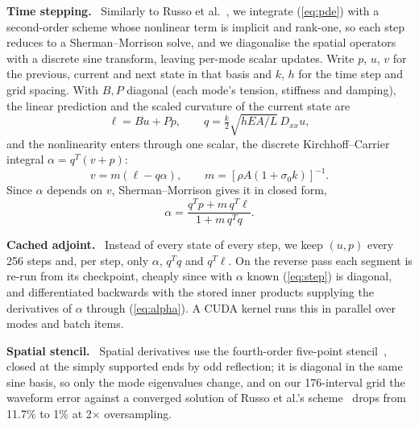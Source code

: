 \documentclass[a4paper]{article}
\newcommand{\head}[1]{\par\vspace{2pt}\noindent\textbf{#1.}\ \ignorespaces}
\begin{document}
\begin{sloppy}
\head{Time stepping}
Similarly to Russo et al.~\cite{russo2026}, we integrate (\ref{eq:pde}) with
a second-order scheme whose nonlinear term is implicit and rank-one, so each
step reduces to a Sherman--Morrison solve, and we diagonalise the spatial
operators with a discrete sine transform, leaving per-mode scalar updates.
Write $p$, $u$, $v$ for the previous, current and next state in that basis
and $k$, $h$ for the time step and grid spacing. With $B,P$ diagonal (each
mode's tension, stiffness and damping), the linear prediction and the scaled
curvature of the current state are
\begin{equation}
\ell=Bu+Pp,\qquad q=\tfrac{k}{2}\sqrt{hEA/L}\,D_{xx}u,
\label{eq:linear}
\end{equation}
and the nonlinearity enters through one scalar, the discrete
Kirchhoff--Carrier integral $\alpha=q^T(v+p)$:
\begin{equation}
v=m(\ell-q\alpha),\qquad m=[\rho A(1+\sigma_0k)]^{-1}.
\label{eq:step}
\end{equation}
Since $\alpha$ depends on $v$, Sherman--Morrison gives it in closed form,
\begin{equation}
\alpha=\frac{q^Tp+m\,q^T\ell}{1+m\,q^Tq}.
\label{eq:alpha}
\end{equation}

\head{Cached adjoint}
Instead of every state of every step, we keep $(u,p)$ every 256 steps and,
per step, only $\alpha$, $q^Tq$ and $q^T\ell$. On the reverse pass each
segment is re-run from its checkpoint, cheaply since with $\alpha$ known
(\ref{eq:step}) is diagonal, and differentiated backwards with the stored
inner products supplying the derivatives of $\alpha$ through
(\ref{eq:alpha}). A CUDA kernel runs this in parallel over modes and batch
items.

\head{Spatial stencil}
Spatial derivatives use the fourth-order five-point
stencil~\cite{bilbao2009}, closed at the simply supported ends by odd
reflection; it is diagonal in the same sine basis, so only the mode
eigenvalues change, and on our 176-interval grid the waveform error against
a converged solution of Russo et al.'s scheme~\cite{russo2026} drops from
11.7\% to 1\% at 2$\times$ oversampling.


\end{sloppy}
\end{document}
